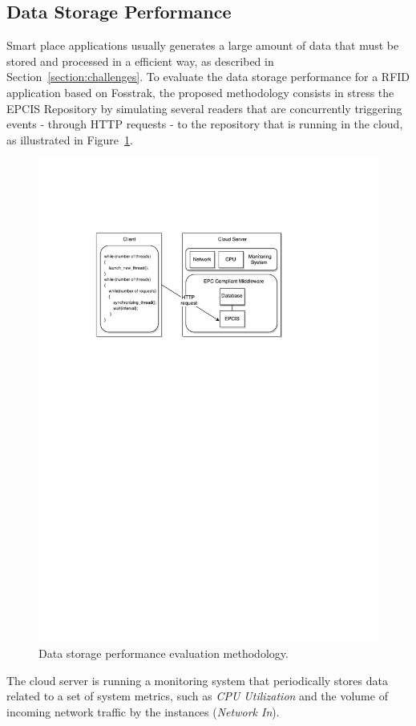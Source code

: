 \subsection{Data Storage Performance}
\label{sub:eval_methodology_data}
Smart place applications usually generates a large amount of data that must be stored and processed in
a efficient way, as described in Section~\ref{section:challenges}. To evaluate the data storage
performance for a \gls{RFID} application based on Fosstrak, the proposed methodology consists in
stress the \gls{EPCIS} Repository by simulating several readers that are concurrently triggering events -
through \gls{HTTP} requests - to the repository that is running in the cloud, as illustrated in Figure~\ref{fig:eval_data_methodology}.

\begin{figure}[ht!]
  \centering
  \includegraphics[width=.7\textwidth]{./images/eval_data_methodology}
  \caption[Data storage evaluation methodology.]{Data storage performance evaluation methodology.}
  \label{fig:eval_data_methodology}
\end{figure}

The cloud server is running a monitoring system that periodically stores data related to a set of
system metrics, such as \textit{CPU Utilization} and the volume of incoming network traffic
by the instances (\textit{Network In}).\\


